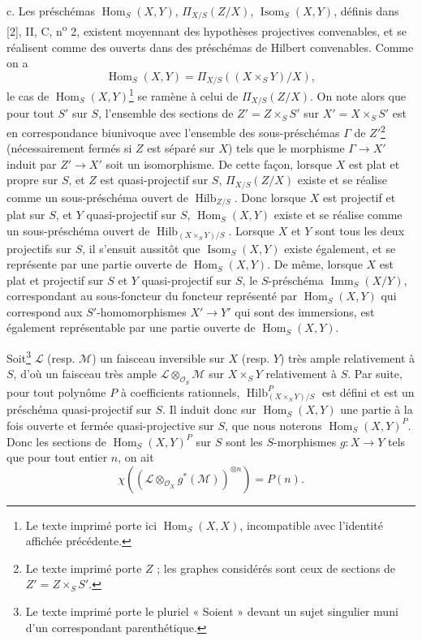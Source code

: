 \medskip
\noindent c. Les préschémas $\operatorname{Hom}_S(X,Y)$,
$\Pi_{X/S}(Z/X)$, $\operatorname{Isom}_S(X,Y)$, définis dans [2], II, C,
n\textsuperscript{o} 2, existent moyennant des hypothèses projectives
convenables, et se réalisent comme des ouverts dans des préschémas de Hilbert
convenables. Comme on a
\[
\operatorname{Hom}_S(X,Y)=\Pi_{X/S}((X\times_SY)/X),
\]
le cas de $\operatorname{Hom}_S(X,Y)$\footnote{Le texte imprimé porte ici $\operatorname{Hom}_S(X,X)$, incompatible avec l'identité affichée précédente.} se ramène à celui de $\Pi_{X/S}(Z/X)$.
On note alors que pour tout $S'$ sur $S$, l'ensemble des sections de
$Z'=Z\times_SS'$ sur $X'=X\times_SS'$ est en correspondance biunivoque avec
l'ensemble des sous-préschémas $\Gamma$ de $Z'$\footnote{Le texte imprimé porte $Z$ ; les graphes considérés sont ceux de sections de $Z'=Z\times_SS'$.} (nécessairement fermés si $Z$
est séparé sur $X$) tels que le morphisme $\Gamma\longrightarrow X'$ induit par
$Z'\longrightarrow X'$ soit un isomorphisme. De cette façon,
lorsque $X$ est plat et propre sur $S$, et $Z$ est quasi-projectif sur $S$,
$\Pi_{X/S}(Z/X)$ existe et se réalise comme un sous-préschéma ouvert de
$\operatorname{Hilb}_{Z/S}$. Donc lorsque $X$ est projectif et plat sur $S$, et
$Y$ quasi-projectif sur $S$, $\operatorname{Hom}_S(X,Y)$ existe et se réalise
comme un sous-préschéma ouvert de
$\operatorname{Hilb}_{(X\times_SY)/S}$. Lorsque $X$ et $Y$ sont tous les deux
projectifs sur $S$, il s'ensuit aussitôt que $\operatorname{Isom}_S(X,Y)$
existe également, et se représente par une partie ouverte de
$\operatorname{Hom}_S(X,Y)$. De même, lorsque $X$ est plat et projectif sur $S$
et $Y$ quasi-projectif sur $S$, le $S$-préschéma
$\operatorname{Imm}_S(X/Y)$, correspondant au sous-foncteur du foncteur
représenté par $\operatorname{Hom}_S(X,Y)$ qui correspond aux
$S'$-homomorphismes $X'\longrightarrow Y'$ qui sont des immersions, est
également représentable par une partie ouverte de
$\operatorname{Hom}_S(X,Y)$.

Soit\footnote{Le texte imprimé porte le pluriel « Soient » devant un sujet singulier muni d'un correspondant parenthétique.} $\mathcal L$ (resp. $\mathcal M$) un faisceau inversible sur $X$ (resp.
$Y$) très ample relativement à $S$, d'où un faisceau très ample
$\mathcal L\otimes_{\mathcal O_S}\mathcal M$ sur $X\times_SY$ relativement à
$S$. Par suite, pour tout polynôme $P$ à coefficients rationnels,
$\operatorname{Hilb}^P_{(X\times_SY)/S}$ est défini et est un préschéma
quasi-projectif sur $S$. Il induit donc sur $\operatorname{Hom}_S(X,Y)$ une
partie à la fois ouverte et fermée quasi-projective sur $S$, que nous noterons
$\operatorname{Hom}_S(X,Y)^P$. Donc les sections de
$\operatorname{Hom}_S(X,Y)^P$ sur $S$ sont les $S$-morphismes
$g:X\longrightarrow Y$ tels que pour tout entier $n$, on ait
\[
\chi\!\left(\left(\mathcal L\otimes_{\mathcal O_X}g^*(\mathcal M)\right)^{
\otimes n}\right)=P(n).
\]


